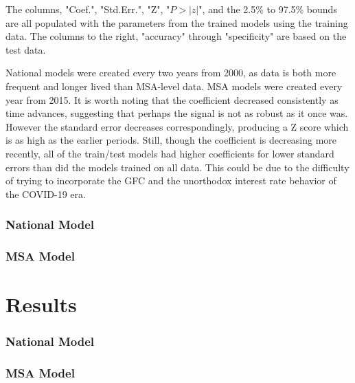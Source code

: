 The columns, "Coef.", "Std.Err.", "Z", "$P>|z|$", and the 2.5\% to 97.5\% bounds are all populated with the parameters from the trained models using the training data. The columns to the right, "accuracy" through "specificity" are based on the test data. 

National models were created every two years from 2000, as data is both more frequent and longer lived than MSA-level data. MSA models were created every year from 2015. It is worth noting that the coefficient decreased consistently as time advances, suggesting that perhaps the signal is not as robust as it once was. However the standard error decreases correspondingly, producing a Z score which is as high as the earlier periods. Still, though the coefficient is decreasing more recently, all of the train/test models had higher coefficients for lower standard errors than did the models trained on all data. This could be due to the difficulty of trying to incorporate the GFC and the unorthodox interest rate behavior of the COVID-19 era. 

\subsubsection{National Model}

\subsubsection{MSA Model}

\section{Results}


\subsubsection{National Model}

\subsubsection{MSA Model}



